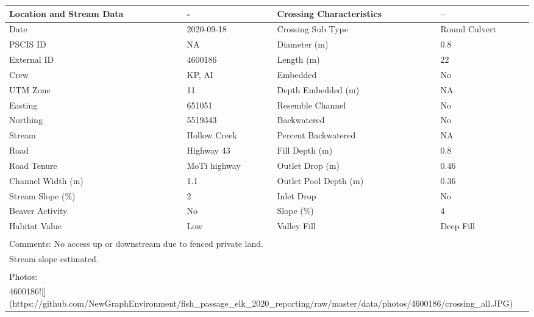 \documentclass[
]{book}
\begin{document}
\begin{tabular}{l|l|l|l}
\hline
Location and Stream Data & - & Crossing Characteristics & --\\
\hline
Date & 2020-09-18 & Crossing Sub Type & Round Culvert\\
\hline
PSCIS ID & NA & Diameter (m) & 0.8\\
\hline
External ID & 4600186 & Length (m) & 22\\
\hline
Crew & KP, AI & Embedded & No\\
\hline
UTM Zone & 11 & Depth Embedded (m) & NA\\
\hline
Easting & 651051 & Resemble Channel & No\\
\hline
Northing & 5519343 & Backwatered & No\\
\hline
Stream & Hollow Creek & Percent Backwatered & NA\\
\hline
Road & Highway 43 & Fill Depth (m) & 0.8\\
\hline
Road Tenure & MoTi highway & Outlet Drop (m) & 0.46\\
\hline
Channel Width (m) & 1.1 & Outlet Pool Depth (m) & 0.36\\
\hline
Stream Slope (\%) & 2 & Inlet Drop & No\\
\hline
Beaver Activity & No & Slope (\%) & 4\\
\hline
Habitat Value & Low & Valley Fill & Deep Fill\\
\hline
\multicolumn{4}{l}{\textsuperscript{} Comments: No access up or downstream due to fenced private land.}\\
\multicolumn{4}{l}{Stream slope estimated.}\\
\multicolumn{4}{l}{\textsuperscript{} Photos:}\\
\multicolumn{4}{l}{4600186![](https://github.com/NewGraphEnvironment/fish\_passage\_elk\_2020\_reporting/raw/master/data/photos/4600186/crossing\_all.JPG)}\\
\end{tabular}
\end{document}
